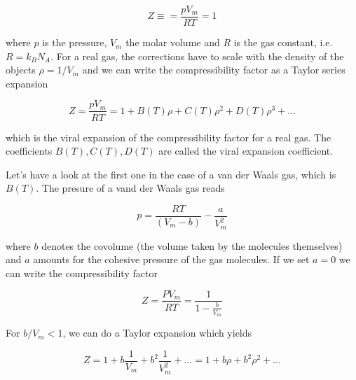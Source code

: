 \documentclass[letterpaper,10pt,english]{sphinxmanual}
\begin{document}
\sphinxAtStartPar
\begin{equation}
Z\equiv = \frac{pV_m}{R T}=1 \tag{compressibility factor}
\end{equation}

\sphinxAtStartPar
where \(p\) is the pressure, \(V_m\) the molar volume and \(R\) is the gas constant, i.e. \(R=k_B N_A\). For a real gas, the corrections have to scale with the density of the objects \(\rho=1/V_m\) and we can write the compressibility factor as a Taylor series expansion

\sphinxAtStartPar
\begin{equation}
Z=\frac{pV_m}{R T}= 1+ B(T)\rho +C(T)\rho^2 + D(T)\rho^3+\ldots \tag{virial expansion}
\end{equation}

\sphinxAtStartPar
which is the viral expansion of the compressibility factor for a real gas. The coefficients \(B(T),C(T),D(T)\) are called the viral expansion coefficient.

\sphinxAtStartPar
Let’s have a look at the first one in the case of a van der Waals gas, which is \(B(T)\). The presure of a vand der Waals gas reads

\sphinxAtStartPar
\begin{equation}
p=\frac{RT}{(V_m-b)}-\frac{a}{V_m^2}
\end{equation}

\sphinxAtStartPar
where \(b\) denotes the co\sphinxhyphen{}volume (the volume taken by the molecules themselves) and \(a\) amounts for the cohesive pressure of the gas molecules. If we set \(a=0\) we can write the compressibility factor

\sphinxAtStartPar
\begin{equation}
Z=\frac{PV_m}{RT}=\frac{1}{1-\frac{b}{V_m}}
\end{equation}

\sphinxAtStartPar
For \(b/V_m<1\), we can do a Taylor expansion which yields

\sphinxAtStartPar
\begin{equation}
Z=1+b\frac{1}{V_m}+b^2\frac{1}{V_m^2}+\ldots=1+b\rho +b^2 \rho^2 + \ldots
\end{equation}
\end{document}
